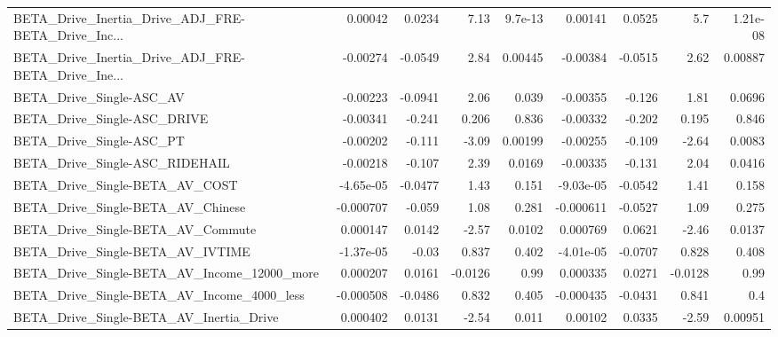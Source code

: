 \begin{tabular}{lrrrrrrrr}
BETA\_Drive\_Inertia\_Drive\_ADJ\_FRE-BETA\_Drive\_Inc... &     0.00042 &       0.0234 &     7.13 &  9.7e-13 &    0.00141 &      0.0525 &          5.7 &      1.21e-08 \\
BETA\_Drive\_Inertia\_Drive\_ADJ\_FRE-BETA\_Drive\_Ine... &    -0.00274 &      -0.0549 &     2.84 &  0.00445 &   -0.00384 &     -0.0515 &         2.62 &       0.00887 \\
BETA\_Drive\_Single-ASC\_AV                           &    -0.00223 &      -0.0941 &     2.06 &    0.039 &   -0.00355 &      -0.126 &         1.81 &        0.0696 \\
BETA\_Drive\_Single-ASC\_DRIVE                        &    -0.00341 &       -0.241 &    0.206 &    0.836 &   -0.00332 &      -0.202 &        0.195 &         0.846 \\
BETA\_Drive\_Single-ASC\_PT                           &    -0.00202 &       -0.111 &    -3.09 &  0.00199 &   -0.00255 &      -0.109 &        -2.64 &        0.0083 \\
BETA\_Drive\_Single-ASC\_RIDEHAIL                     &    -0.00218 &       -0.107 &     2.39 &   0.0169 &   -0.00335 &      -0.131 &         2.04 &        0.0416 \\
BETA\_Drive\_Single-BETA\_AV\_COST                     &   -4.65e-05 &      -0.0477 &     1.43 &    0.151 &  -9.03e-05 &     -0.0542 &         1.41 &         0.158 \\
BETA\_Drive\_Single-BETA\_AV\_Chinese                  &   -0.000707 &       -0.059 &     1.08 &    0.281 &  -0.000611 &     -0.0527 &         1.09 &         0.275 \\
BETA\_Drive\_Single-BETA\_AV\_Commute                  &    0.000147 &       0.0142 &    -2.57 &   0.0102 &   0.000769 &      0.0621 &        -2.46 &        0.0137 \\
BETA\_Drive\_Single-BETA\_AV\_IVTIME                   &   -1.37e-05 &        -0.03 &    0.837 &    0.402 &  -4.01e-05 &     -0.0707 &        0.828 &         0.408 \\
BETA\_Drive\_Single-BETA\_AV\_Income\_12000\_more        &    0.000207 &       0.0161 &  -0.0126 &     0.99 &   0.000335 &      0.0271 &      -0.0128 &          0.99 \\
BETA\_Drive\_Single-BETA\_AV\_Income\_4000\_less         &   -0.000508 &      -0.0486 &    0.832 &    0.405 &  -0.000435 &     -0.0431 &        0.841 &           0.4 \\
BETA\_Drive\_Single-BETA\_AV\_Inertia\_Drive            &    0.000402 &       0.0131 &    -2.54 &    0.011 &    0.00102 &      0.0335 &        -2.59 &       0.00951 \\

\end{tabular}
